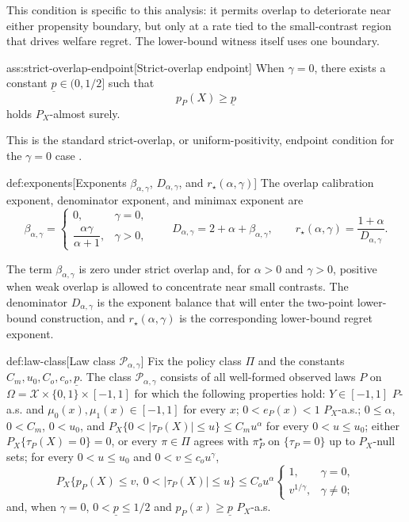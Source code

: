 \documentclass[11pt]{article}
\begin{document}
This condition is specific to this analysis: it permits overlap to deteriorate near either propensity boundary, but only at a rate tied to the small-contrast region that drives welfare regret.  The lower-bound witness itself uses one boundary.

\begin{assumptionv}{ass:strict-overlap-endpoint}[Strict-overlap endpoint]
When \(\gamma=0\), there exists a constant \(\underline p\in(0,1/2]\) such that
\[
p_P(X)\ge \underline p
\]
holds \(P_X\)-almost surely.
\end{assumptionv}

This is the standard strict-overlap, or uniform-positivity, endpoint condition for the \(\gamma=0\) case \citep{Imbens2015}.

\begin{definitionv}{def:exponents}[Exponents $\beta_{\alpha,\gamma}$, $D_{\alpha,\gamma}$, and $r_\star(\alpha,\gamma)$]
The overlap calibration exponent, denominator exponent, and minimax exponent are
\[
\beta_{\alpha,\gamma}
=
\begin{cases}
0, & \gamma=0,\\
\dfrac{\alpha\gamma}{\alpha+1}, & \gamma>0,
\end{cases}
\qquad
D_{\alpha,\gamma}=2+\alpha+\beta_{\alpha,\gamma},
\qquad
r_\star(\alpha,\gamma)=\frac{1+\alpha}{D_{\alpha,\gamma}}.
\]
\end{definitionv}

The term \(\beta_{\alpha,\gamma}\) is zero under strict overlap and, for \(\alpha>0\) and \(\gamma>0\), positive when weak overlap is allowed to concentrate near small contrasts.  The denominator \(D_{\alpha,\gamma}\) is the exponent balance that will enter the two-point lower-bound construction, and \(r_\star(\alpha,\gamma)\) is the corresponding lower-bound regret exponent.

\begin{definitionv}{def:law-class}[Law class \(\mathcal P_{\alpha,\gamma}\)]
Fix the policy class \(\Pi\) and the constants \(C_m,u_0,C_o,c_o,\underline p\). The class \(\mathcal P_{\alpha,\gamma}\) consists of all well-formed observed laws \(P\) on \(\Omega=\mathcal X\times\{0,1\}\times[-1,1]\) for which the following properties hold: \(Y\in[-1,1]\) \(P\)-a.s. and \(\mu_0(x),\mu_1(x)\in[-1,1]\) for every \(x\); \(0<e_P(x)<1\) \(P_X\)-a.s.; \(0\le\alpha\), \(0<C_m\), \(0<u_0\), and \(P_X\{0<|\tau_P(X)|\le u\}\le C_m u^\alpha\) for every \(0<u\le u_0\); either \(P_X\{\tau_P(X)=0\}=0\), or every \(\pi\in\Pi\) agrees with \(\pi^\star_P\) on \(\{\tau_P=0\}\) up to \(P_X\)-null sets; for every \(0<u\le u_0\) and \(0<v\le c_o u^\gamma\), \[P_X\{p_P(X)\le v,\ 0<|\tau_P(X)|\le u\}\le C_o u^\alpha\begin{cases}1,&\gamma=0,\\ v^{1/\gamma},&\gamma\ne0;\end{cases}\] and, when \(\gamma=0\), \(0<\underline p\le1/2\) and \(p_P(x)\ge\underline p\) \(P_X\)-a.s.
\end{definitionv}
\end{document}
